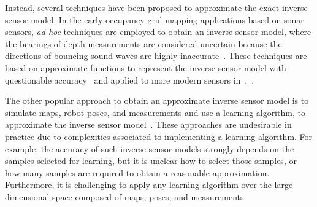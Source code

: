 \documentclass[letterpaper, 10pt, conference]{ieeeconf}
\begin{document}
Instead, several techniques have been proposed to approximate the exact inverse sensor model. %
In the early occupancy grid mapping applications based on sonar sensors, \emph{ad hoc} techniques are employed to obtain an inverse sensor model, where the bearings of depth measurements are considered uncertain because the directions of bouncing sound waves are highly inaccurate~\cite{MorElf85,Elf89}.
These techniques are based on approximate functions to represent the inverse sensor model with questionable accuracy~\cite{ChoLynHutKanBurKavThr05} and applied to more modern sensors in~\cite{And09},~\cite{PirRutBisSch11}.

The other popular approach to obtain an approximate inverse sensor model is to simulate maps, robot poses, and measurements and use a learning algorithm, to approximate the inverse sensor model~\cite{Thr01,ThrBurFox05}. These approaches are undesirable in practice due to complexities associated to implementing a learning algorithm. For example, the accuracy of such inverse sensor models strongly depends on the samples selected for learning, but it is unclear how to select those samples, or how many samples are required to obtain a reasonable approximation. Furthermore, it is challenging to apply any learning algorithm over the large dimensional space composed of maps, poses, and measurements. 




\end{document}
